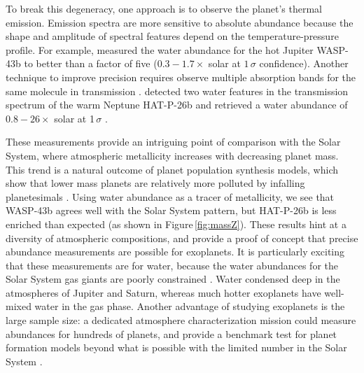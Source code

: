 \documentclass[graybox,natbib,nosecnum]{svmult}
\begin{document}
To break this degeneracy, one approach is to observe the planet's thermal emission.  Emission spectra are more sensitive to absolute abundance because the shape and amplitude of spectral features depend on the temperature-pressure profile. For example, \cite{stevenson17} measured the water abundance for the hot Jupiter WASP-43b to better than a factor of five  ($0.3 - 1.7\times$ solar at $1\,\sigma$ confidence). Another technique to improve precision requires observe multiple absorption bands for the same molecule in transmission \citep{benneke12}.  \cite{wakeford17} detected two water features in the transmission spectrum of the warm Neptune HAT-P-26b and retrieved a water abundance of $0.8 - 26\times$ solar at 1\,$\sigma$ \citep{wakeford17}.

These measurements provide an intriguing point of comparison with the Solar System, where atmospheric metallicity increases with decreasing planet mass. This trend is a natural outcome of planet population synthesis models, which show that lower mass planets are relatively more polluted by infalling planetesimals \citep{fortney13, mordasini16}. Using water abundance as a tracer of metallicity, we see that WASP-43b agrees well with the Solar System pattern, but HAT-P-26b is less enriched than expected (as shown in Figure\,\ref{fig:massZ}). These results hint at a diversity of atmospheric compositions, and provide a proof of concept that precise abundance measurements are possible for exoplanets. It is particularly exciting that these measurements are for water, because the water abundances for the Solar System gas giants are poorly constrained \citep{showman98, mousis14}. Water condensed deep in the atmospheres of Jupiter and Saturn, whereas much hotter exoplanets have well-mixed water in the gas phase. Another advantage of studying exoplanets is the large sample size: a dedicated atmosphere characterization mission could measure abundances for hundreds of planets, and provide a benchmark test for planet formation models beyond what is possible with the limited number in the Solar System \citep{chapman17}. 
 
\end{document}
